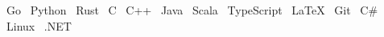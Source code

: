 
\raggedright{
  \textbullet{}~Go
  \textbullet{}~Python
  \textbullet{}~Rust
  \textbullet{}~C
  \textbullet{}~C++
  \textbullet{}~Java
  \textbullet{}~Scala
  \textbullet{}~TypeScript
  \textbullet{}~\LaTeX
  \textbullet{}~Git
  \textbullet{}~C\#
  \textbullet{}~Linux
  \textbullet{}~.NET
}